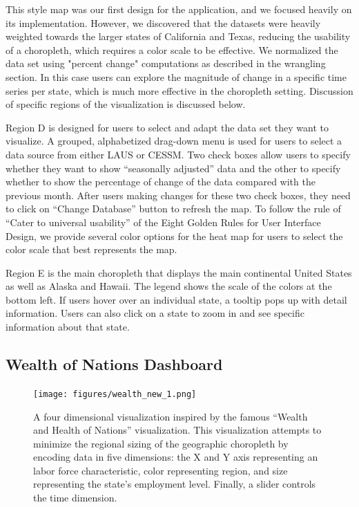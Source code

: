 \documentclass{sigchi}
\begin{document}
{This style map was our first design for the application, and we focused heavily on its implementation. However, we discovered that the datasets were heavily weighted towards the larger states of California and Texas, reducing the usability of a choropleth, which requires a color scale to be effective. We normalized the data set using "percent change" computations as described in the wrangling section. In this case users can explore the magnitude of change in a specific time series per state, which is much more effective in the choropleth setting. Discussion of specific regions of the visualization is discussed below.

Region D is designed for users to select and adapt the data set they want to visualize. A grouped, alphabetized drag-down menu is used for users to select a data source from either LAUS or CESSM. Two check boxes allow users to specify whether they want to show ``seasonally adjusted'' data and the other to specify whether to show the percentage of change of the data compared with the previous month. After users making changes for these two check boxes, they need to click on ``Change Database'' button to refresh the map. To follow the rule of ``Cater to universal usability'' of the Eight Golden Rules for User Interface Design, we provide several color options for the heat map for users to select the color scale that best represents the map.

Region E is the main choropleth that displays the main continental United States as well as Alaska and Hawaii. The legend shows the scale of the colors at the bottom left. If users hover over an individual state, a tooltip pops up with detail information. Users can also click on a state to zoom in and see specific information about that state.

\subsection{Wealth of Nations Dashboard}

\begin{figure}[!ht]
    \centering
    \texttt{[image: figures/wealth\_new\_1.png]}
    \caption{A four dimensional visualization inspired by the famous ``Wealth and Health of Nations'' visualization. This visualization attempts to minimize the regional sizing of the geographic choropleth by encoding data in five dimensions: the X and Y axis representing an labor force characteristic, color representing region, and size representing the state's employment level. Finally, a slider controls the time dimension.}
    \label{fig:wealth}
\end{figure}

}
\end{document}

